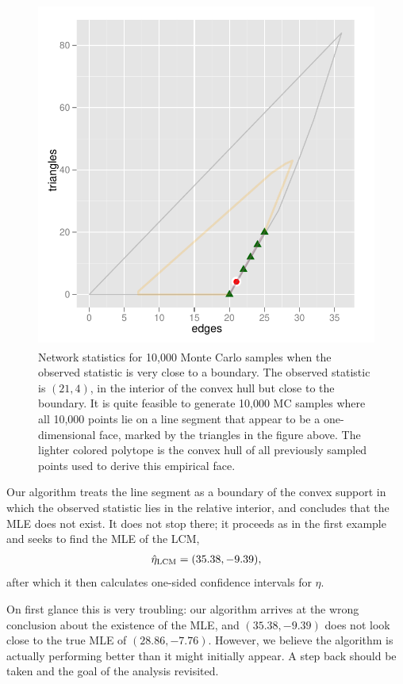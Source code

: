 \begin{figure}[!h]
\centering
\includegraphics[height=4.5in,width=4.5in]{Figures/MCsample-fakeface}
\caption[Network statistics for 10,000 Monte Carlo samples when the observed 
statistic is very close to a boundary]
{Network statistics for 10,000 Monte Carlo samples when the observed 
statistic is very close to a boundary.  The observed statistic is $(21,4)$, 
in the interior of the convex hull but 
close to the boundary.  It is quite feasible to generate 10,000 MC 
samples where all 10,000 points lie on a line segment that appear to be 
a one-dimensional face, marked by the triangles in the figure above.  
The lighter colored polytope is the convex hull of all previously 
sampled points used to derive this empirical face.}
\label{F:MC problem}
\end{figure}

Our algorithm treats the line segment as a boundary of the 
convex support in which the observed statistic lies in the relative interior, and 
concludes that the MLE does not exist.  It does not stop there; 
it proceeds as in the first
example and seeks to find the MLE of the LCM,
\begin{align*}
	\hat{\eta}_{\textrm{LCM}} = (35.38, -9.39),
\end{align*}
after which it then calculates one-sided confidence intervals for $\eta$.

On first glance this is very troubling: our algorithm arrives at the wrong conclusion 
about the existence of the MLE, and $(35.38, -9.39)$ does not look close 
to the true MLE of $(28.86, -7.76)$.  However, we believe the algorithm is
actually performing better than it might initially appear.
A step back should be taken and the goal of the analysis revisited.  

